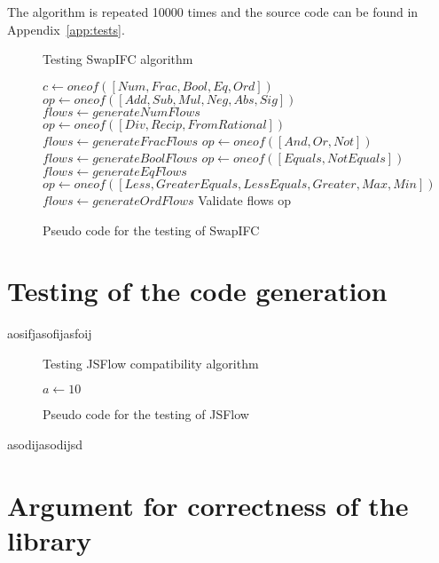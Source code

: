 The algorithm is repeated 10000 times and the source code can be found in Appendix~\ref{app:tests}.

\begin{figure}[h]
  \begin{algorithm}[H]
    \caption{Testing SwapIFC algorithm}
    \begin{algorithmic}
      \State $c\gets oneof([Num, Frac, Bool, Eq, Ord])$
          \State $op\gets oneof([Add, Sub, Mul, Neg, Abs, Sig])$
          \State $flows\gets generateNumFlows$
      \EndIf        
          \State $op\gets oneof([Div, Recip, FromRational])$
          \State $flows\gets generateFracFlows$
      \EndIf
          \State $op\gets oneof([And, Or, Not])$
          \State $flows\gets generateBoolFlows$
      \EndIf
          \State $op\gets oneof([Equals, NotEquals])$
          \State $flows\gets generateEqFlows$
      \EndIf
          \State $op\gets oneof([Less, GreaterEquals, LessEquals, Greater, Max, Min])$
          \State $flows\gets generateOrdFlows$
      \EndIf
      \State
      \State
      \Return Validate flows op
    \end{algorithmic}
  \end{algorithm}
  \caption{Pseudo code for the testing of SwapIFC}
  \label{fig:testing_swapifc}
\end{figure}

\section{Testing of the code generation}
aosifjasofijasfoij
\begin{figure}[h]
  \begin{algorithm}[H]
    \caption{Testing JSFlow compatibility algorithm}
    \begin{algorithmic}
         \State $a\gets 10$
      \EndIf
    \end{algorithmic}
  \end{algorithm}
  \caption{Pseudo code for the testing of JSFlow}
  \label{fig:testing_jsflow}
\end{figure}
asodijasodijsd

\section{Argument for correctness of the library}

